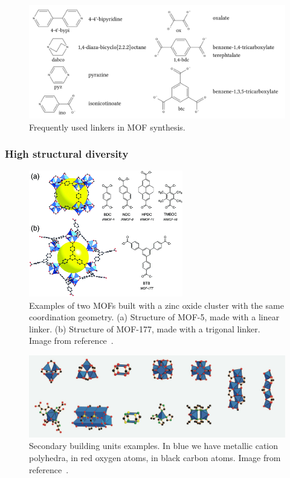 \documentclass[thesis]{subfiles}
\begin{document}
\begin{figure}[ht]
    \centering
    \includegraphics[width=\textwidth]{figures/images/mof-linkers}
    \caption{Frequently used linkers in MOF synthesis.}
    \label{fig:mof-linkers}
\end{figure}

\subsubsection{High structural diversity}

\begin{figure}[ht]
    \centering
    \includegraphics[width=0.6\textwidth]{figures/images/mof-different-linker}
    \caption{Examples of two MOFs built with a zinc oxide cluster with the same
    coordination geometry. (a) Structure of MOF-5, made with a linear linker.
    (b) Structure of MOF-177, made with a trigonal linker. Image from
    reference~\cite{Rowsell2004}.}
    \label{fig:mof-different-linkers}
\end{figure}

\begin{figure}[ht]
    \centering
    \includegraphics[width=\textwidth]{figures/images/mofs-sbu}
    \caption{Secondary building units examples. In blue we have metallic cation
    polyhedra, in red oxygen atoms, in black carbon atoms. Image from
    reference~\cite{Furukawa2013}.}
    \label{fig:mofs-sbu}
\end{figure}
\end{document}
